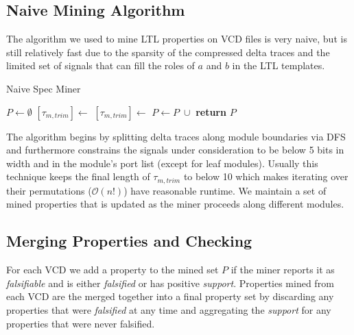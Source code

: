 \documentclass[acmlarge,11pt]{acmart}
\begin{document}
\subsection{Naive Mining Algorithm}
The algorithm we used to mine LTL properties on VCD files is very naive, but is still relatively fast due to the sparsity of the compressed delta traces and the limited set of signals that can fill the roles of $a$ and $b$ in the LTL templates.
\begin{algorithm}[H]
  \caption{Naive Spec Miner}
  \begin{algorithmic}[1]
     
      \State $P \gets \emptyset$
       
        \State $[\tau_{m,trim}] \gets$  
         
          \State $[\tau_{m,trim}] \gets$ 
        \EndIf
            \State $P \gets P \; \cup$ 
          \EndFor
        \EndFor
      \EndFor
      \State \textbf{return} $P$
    \EndProcedure
  \end{algorithmic}
\end{algorithm}

The algorithm begins by splitting delta traces along module boundaries via DFS and furthermore constrains the signals under consideration to be below 5 bits in width and in the module's port list (except for leaf modules).
Usually this technique keeps the final length of $\tau_{m,trim}$ to below 10 which makes iterating over their permutations ($\mathcal{O}(n!)$) have reasonable runtime.
We maintain a set of mined properties that is updated as the miner proceeds along different modules.

\subsection{Merging Properties and Checking}
For each VCD we add a property to the mined set $P$ if the miner reports it as \textit{falsifiable} and is either \textit{falsified} or has positive \textit{support}.
Properties mined from each VCD are the merged together into a final property set by discarding any properties that were \textit{falsified} at any time and aggregating the \textit{support} for any properties that were never falsified.
\end{document}
